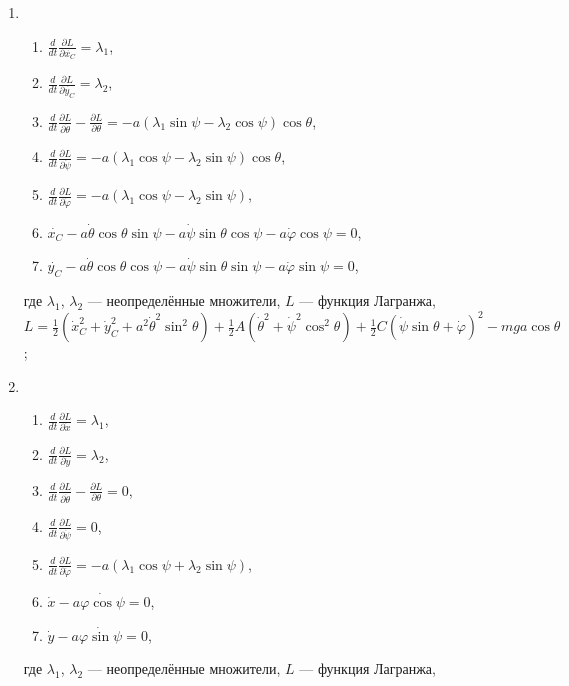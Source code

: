\begin{enumerate}
\item \begin{enumerate}
\item $\frac{d}{dt}\frac{\partial L}{\partial \dot{x_C}} = \lambda _1$,
\item$\frac{d}{dt}\frac{\partial L}{\partial \dot{y_C}} = \lambda _2$,
\item$\frac{d}{dt}\frac{\partial L}{\partial\dot{\theta}} -
\frac{\partial L}{\partial\theta} =
-a(\lambda _1\sin{\psi} - \lambda _2\cos{\psi})\cos{\theta}$,
\item$\frac{d}{dt}\frac{\partial L}{\partial\dot{\psi}} =
-a(\lambda _1\cos{\psi} - \lambda _2\sin{\psi})\cos{\theta}$,
\item$\frac{d}{dt}\frac{\partial L}{\partial\dot{\varphi}} =
-a(\lambda _1\cos{\psi} - \lambda _2\sin{\psi})$,
\item$\dot{x_C} - a\dot{\theta}\cos{\theta}\sin{\psi} -
a\dot{\psi}\sin{\theta}\cos{\psi} - a\dot{\varphi}\cos{\psi} = 0$,
\item$\dot{y_C} - a\dot{\theta}\cos{\theta}\cos{\psi} -
a\dot{\psi}\sin{\theta}\sin{\psi} - a\dot{\varphi}\sin{\psi} = 0$,
\end{enumerate}
где $\lambda _1$, $\lambda _2$ --- неопределённые множители,
$L$ --- функция Лагранжа,
$L = \frac{1}{2}
(\dot{x}^2_C + \dot{y}^2_C + a^2\dot{\theta}^2\sin^2{\theta}) +
\frac{1}{2}A(\dot{\theta}^2 + \dot{\psi}^2\cos^2{\theta}) +
\frac{1}{2}C(\dot{\psi}\sin{\theta} + \dot{\varphi})^2 -
mga\cos{\theta}$;
\item \begin{enumerate}
\item $\frac{d}{dt}\frac{\partial L}{\partial\dot{x}} = \lambda _1$,
\item$\frac{d}{dt}\frac{\partial L}{\partial\dot{y}} = \lambda _2$,
\item$\frac{d}{dt}\frac{\partial L}{\partial\dot{\theta}} -
\frac{\partial L}{\partial\theta} = 0$,
\item$\frac{d}{dt}\frac{\partial L}{\partial\dot{\psi}} = 0$,
\item$\frac{d}{dt}\frac{\partial L}{\partial\dot{\varphi}} =
-a(\lambda _1\cos{\psi} + \lambda _2\sin{\psi})$,
\item$\dot{x} -a\dot{\varphi\cos{\psi}} = 0$,
\item$\dot{y} -a\dot{\varphi\sin{\psi}} = 0$,
\end{enumerate}
где $\lambda _1$, $\lambda _2$ --- неопределённые множители,
$L$ --- функция Лагранжа,

\end{enumerate}
